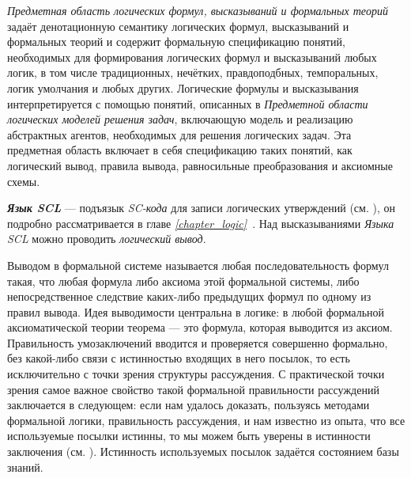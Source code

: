 \textit{Предметная область логических формул, высказываний и формальных теорий} задаёт денотационную семантику логических формул, высказываний и формальных теорий и содержит формальную спецификацию понятий, необходимых для формирования логических формул и высказываний любых логик, в том числе традиционных, нечётких, правдоподбных, темпоральных, логик умолчания и любых других. Логические формулы и высказывания интерпретируется с помощью понятий, описанных в \textit{Предметной области логических моделей решения задач}, включающую модель и реализацию абстрактных агентов, необходимых для решения логических задач. Эта предметная область включает в себя спецификацию таких понятий, как логический вывод, правила вывода, равносильные преобразования и аксиомные схемы.

\textit{\textbf{Язык SCL}} — подъязык \textit{SC-кода} для записи логических утверждений (см. ), он подробно рассматривается в главе \textit{\ref{chapter_logic}~}. Над высказываниями \textit{Языка SCL} можно проводить \textit{логический вывод}.

Выводом в формальной системе называется любая последовательность формул такая, что любая формула либо аксиома этой формальной системы, либо непосредственное следствие каких-либо предыдущих формул по одному из правил вывода. Идея выводимости центральна в логике: в любой формальной аксиоматической теории теорема --- это формула, которая выводится из аксиом. Правильность умозаключений вводится и проверяется совершенно формально, без какой-либо связи с истинностью входящих в него посылок, то есть исключительно с точки зрения структуры рассуждения. С практической точки зрения самое важное свойство такой формальной правильности рассуждений заключается в следующем: если нам удалось доказать, пользуясь методами формальной логики, правильность рассуждения, и нам известно из опыта, что все используемые посылки истинны, то мы можем быть уверены в истинности заключения (см. ). Истинность используемых посылок задаётся состоянием базы знаний.

